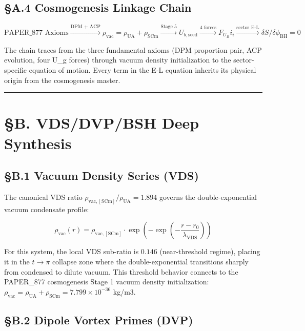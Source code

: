 \documentclass[12pt,a4paper]{article}
\begin{document}
\subsection{\S{}A.4 Cosmogenesis Linkage Chain}

\begin{equation}
\text{PAPER\_877 Axioms} \xrightarrow{\text{DPM + ACP}} \rho_{\mathrm{vac}} = \rho_{\mathrm{UA}} + \rho_{\mathrm{SCm}} \xrightarrow{\text{Stage 5}} U_{b,\mathrm{seed}} \xrightarrow{\text{4 forces}} F_U_Bi_i \xrightarrow{\text{sector E-L}} \delta S/\delta \phi_{\mathrm{BH}} = 0
\end{equation}

The chain traces from the three fundamental axioms (DPM proportion pair, ACP evolution, four U\_g forces) through vacuum density initialization to the sector-specific equation of motion. Every term in the E-L equation inherits its physical origin from the cosmogenesis master.

\medskip\hrule\medskip

\section{\S{}B. VDS/DVP/BSH Deep Synthesis}

\subsection{\S{}B.1 Vacuum Density Series (VDS)}

The canonical VDS ratio $\rho_{\mathrm{vac,[SCm]}} / \rho_{\mathrm{UA}} = 1.894$ governs the double-exponential vacuum condensate profile:

\begin{equation}
\rho_{\mathrm{vac}}(r) = \rho_{\mathrm{vac,[SCm]}} \cdot \exp\!\left(-\exp\!\left(-\frac{r - r_0}{\lambda_{\mathrm{VDS}}}\right)\right)
\end{equation}

For this system, the local VDS sub-ratio is $0.146$ (near-threshold regime), placing it in the $t \to \pi$ collapse zone where the double-exponential transitions sharply from condensed to dilute vacuum. This threshold behavior connects to the PAPER\_877 cosmogenesis Stage 1 vacuum density initialization: $\rho_{\mathrm{vac}} = \rho_{\mathrm{UA}} + \rho_{\mathrm{SCm}} = 7.799 \times 10^{-36}$ kg/m3.

\subsection{\S{}B.2 Dipole Vortex Primes (DVP)}
\end{document}
